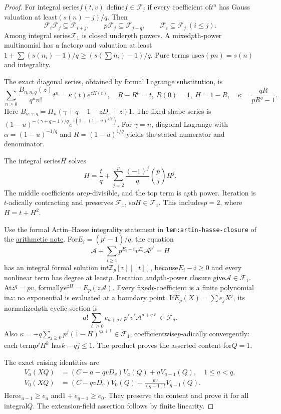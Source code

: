\documentclass[11pt]{article}
\begin{document}
\begin{proof}
For integral series$f(t,v)$ define$f\in\mathcal F_j$ if every
coefficient of$t^n$ has Gauss valuation at least$(s(n)-j)/q$.
Then
\[
 \mathcal F_i\mathcal F_j\subseteq\mathcal F_{i+j},\qquad
 p\mathcal F_j\subseteq\mathcal F_{j-q},\qquad
 \mathcal F_i\subseteq\mathcal F_j\ (i\le j).
\]
Among integral series$\mathcal F_1$ is closed under$p$th powers.
A mixed$p$th-power multinomial has a factor$p$ and valuation
at least$1+\sum(s(n_i)-1)/q\ge(s(\sum n_i)-1)/q$.
Pure terms use$s(pn)=s(n)$ and integrality.

The exact diagonal series, obtained by formal Lagrange
substitution, is
\[
 \sum_{n\ge0}\frac{B_{n,n,q}(z)}{q^nn!}t^n
     =\kappa(t)e^{zH(t)},\quad
 R-R^p=t,\ R(0)=1,\ H=1-R,\quad
 \kappa=\frac{qR}{pR^q-1}.
\]
Here $B_{n,\gamma,q}=\Pi_n(\gamma+q-1-zD_z+z)1$. The fixed-shape series is
$(1-u)^{-(\gamma+q-1)/q}
 e^{z(1-(1-u)^{1/q})}$.
For $\gamma=n$, diagonal Lagrange with $\alpha=(1-u)^{-1/q}$
and $R=(1-u)^{1/q}$ yields
the stated numerator and denominator.

The integral series$H$ solves
\[
 H=\frac tq+\sum_{j=2}^p
                 \frac{(-1)^j}{q}\binom pj H^j.
\]
The middle coefficients are$p$-divisible, and the top term is
a$p$th power. Iteration is$t$-adically contracting and preserves
$\mathcal F_1$, so$H\in\mathcal F_1$.
This includes$p=2$, where$H=t+H^2$.

Use the formal Artin--Hasse integrality statement in
\texttt{lem:artin-hasse-closure} of the
\href{ARITHMETIC_FRONTIER_TERMINAL_ORDERS.tex}
{arithmetic note}.
For$E_i=(p^i-1)/q$, the equation
\[
 \mathscr A+\sum_{i\ge1}p^{E_i-i}v^{E_i}\mathscr A^{p^i}=H
\]
has an integral formal solution in$t\mathbb Z_p[v][[t]]$,
because$E_i-i\ge0$ and every nonlinear term has degree at least$p$.
Iteration and$p$th-power closure give$\mathscr A\in\mathcal F_1$.
At$z^q=pv$, formally$e^{zH}=E_p(z\mathscr A)$.
Every fixed$t$-coefficient is a finite polynomial in$z$:
no exponential is evaluated at a boundary point.
If$E_p(X)=\sum e_jX^j$, its normalized$a$th cyclic section is
\[
 a!\sum_{\ell\ge0}e_{a+q\ell}p^\ell v^\ell
                         \mathscr A^{a+q\ell}\in\mathcal F_a.
\]
Also
$\kappa=-q\sum_{j\ge0}p^j(1-H)^{qj+1}\in\mathcal F_1$,
coefficientwise$p$-adically convergently:
each term$p^jH^k$ has$k-qj\le1$.
The product proves the asserted content for$Q=1$.

The exact raising identities are
\[
 \begin{aligned}
 V_a(XQ)&=(C-a-qvD_v)V_a(Q)+aV_{a-1}(Q),\quad 1\le a<q,\\
 V_0(XQ)&=(C-qvD_v)V_0(Q)+\frac{pv}{(q-1)!}V_{q-1}(Q).
 \end{aligned}
\]
Here$e_{a-1}\ge e_a$ and$1+e_{q-1}\ge e_0$.
They preserve the content and prove it for all integral$Q$.
The extension-field assertion follows by finite linearity.
\end{proof}
\end{document}
